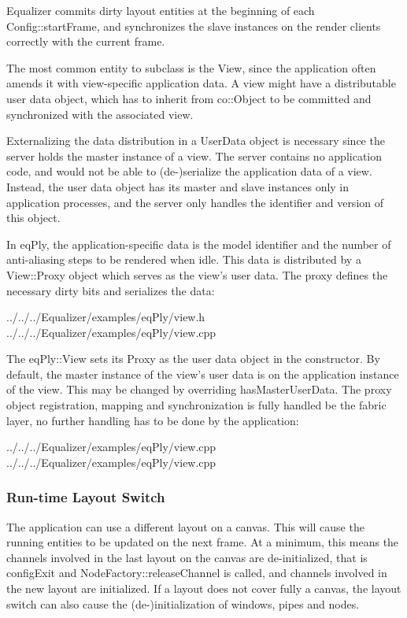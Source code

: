 \documentclass[10pt,a4]{scrartcl}
\begin{document}
Equalizer commits dirty layout entities at the beginning of each
\textsf{Config::startFrame}, and synchronizes the slave instances on the
render clients correctly with the current frame.

The most common entity to subclass is the \textsf{View}, since the application
often amends it with view-specific application data. A view might have a
distributable user data object, which has to inherit from \textsf{co::Object} to
be committed and synchronized with the associated view.

Externalizing the data distribution in a \textsf{UserData} object is necessary
since the server holds the master instance of a view. The server contains no
application code, and would not be able to (de-)serialize the application data
of a view. Instead, the user data object has its master and slave instances only
in application processes, and the server only handles the identifier and version
of this object.

In \textsf{eqPly}, the application-specific data is the model identifier and the
number of anti-aliasing steps to be rendered when idle. This data is distributed
by a \textsf{View::Proxy} object which serves as the view's user data. The proxy
defines the necessary dirty bits and serializes the data:

{\footnotesize
  {../../../Equalizer/examples/eqPly/view.h}}
{\footnotesize
  {../../../Equalizer/examples/eqPly/view.cpp}}

The \textsf{eqPly::View} sets its \textsf{Proxy} as the user data object in the
constructor. By default, the master instance of the view's user data is on the
application instance of the view. This may be changed by overriding
\textsf{hasMasterUserData}. The proxy object registration, mapping and
synchronization is fully handled be the \textsf{fabric} layer, no further
handling has to be done by the application:

{\footnotesize
  {../../../Equalizer/examples/eqPly/view.cpp}}
{\footnotesize
  {../../../Equalizer/examples/eqPly/view.cpp}}

\subsubsection{Run-time Layout Switch}

The application can use a different layout on a canvas. This will cause
the running entities to be updated on the next frame. At a minimum, this
means the channels involved in the last layout on the canvas are
de-initialized, that is \textsf{configExit} and
\textsf{NodeFactory::releaseChannel} is called, and channels involved in
the new layout are initialized. If a layout does not cover fully a
canvas, the layout switch can also cause the (de-)initialization of
windows, pipes and nodes.
\end{document}

